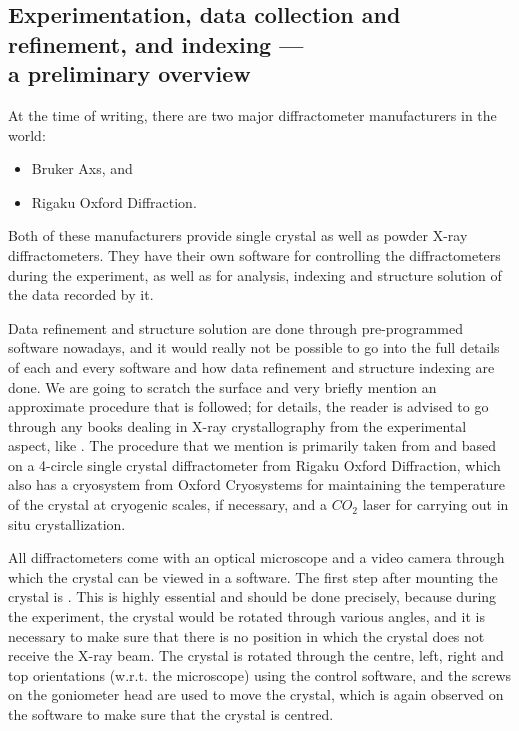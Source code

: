 \subsection[Data collection and indexing (an overview)]{Experimentation, data collection and refinement, and indexing --- \\a preliminary overview}

At the time of writing, there are two major diffractometer manufacturers in the world:%
%	
	\begin{itemize}%
%	
	    \item Bruker Axs, and
	    
	    \item Rigaku Oxford Diffraction.
	    
	\end{itemize}
	
Both of these manufacturers provide single crystal as well as powder X-ray diffractometers. They have their own software for controlling the diffractometers during the experiment, as well as for analysis, indexing and structure solution of the data recorded by it.

Data refinement and structure solution are done through pre-programmed software nowadays, and it would really not be possible to go into the full details of each and every software and how data refinement and structure indexing are done. We are going to scratch the surface and very briefly mention an approximate procedure that is followed; for details, the reader is advised to go through any books dealing in X-ray crystallography from the experimental aspect, like \cite{Cullity2014}. The procedure that we mention is primarily taken from \cite{Chowdhury2022} and based on a 4-circle single crystal diffractometer from Rigaku Oxford Diffraction, which also has a cryosystem from Oxford Cryosystems for maintaining the temperature of the crystal at cryogenic scales, if necessary, and a $CO_2$ laser for carrying out in situ crystallization.

All diffractometers come with an optical microscope and a video camera through which the crystal can be viewed in a software. The first step after mounting the crystal is . This is highly essential and should be done precisely, because during the experiment, the crystal would be rotated through various angles, and it is necessary to make sure that there is no position in which the crystal does not receive the X-ray beam. The crystal is rotated through the centre, left, right and top orientations (w.r.t. the microscope) using the control software, and the screws on the goniometer head are used to move the crystal, which is again observed on the software to make sure that the crystal is centred.

